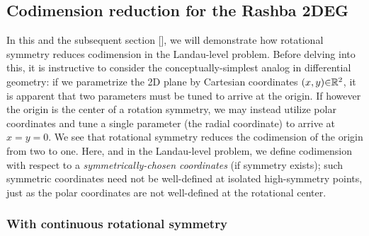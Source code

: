 \documentclass[aps, prb, showpacs, twocolumn, notitlepage, superscriptaddress]{revtex4-1}
\begin{document}



\subsection{Codimension reduction for the Rashba 2DEG}


In this and the subsequent section [], we will demonstrate how rotational symmetry reduces codimension in the Landau-level problem. Before delving into this, it is instructive to consider the conceptually-simplest analog in differential geometry: if we parametrize the 2D plane by Cartesian coordinates $(x,y){\in}\mathbb{R}^2$, it is apparent that two parameters must be tuned to arrive at the origin. If however the origin is the center of a rotation symmetry, we may instead utilize polar coordinates and tune a single parameter (the radial coordinate) to arrive at $x{=}y{=}0$. We see that rotational symmetry reduces the codimension of the origin from two to one. Here, and in the  Landau-level problem, we define codimension with respect to a \textit{symmetrically-chosen coordinates} (if symmetry exists); such symmetric coordinates need not be well-defined at isolated high-symmetry points, just as the polar coordinates are not well-defined at the rotational center.


\subsubsection{With continuous rotational symmetry}

\end{document}
